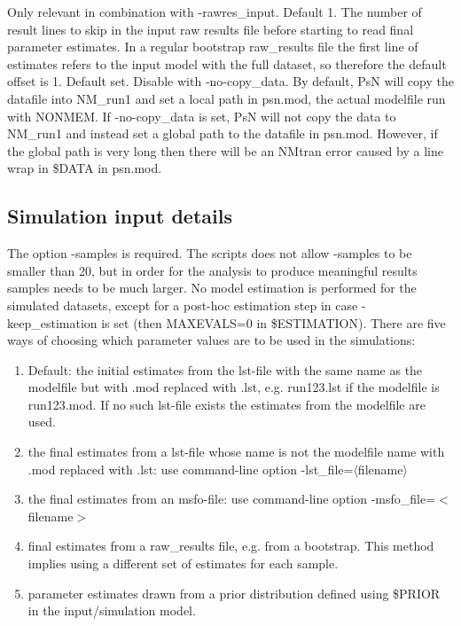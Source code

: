\begin{optionlist}
\nextopt
{}
Only relevant in combination with -rawres\_input. Default 1. The number of result lines to skip in the input raw results file before starting to read final parameter estimates. In a regular bootstrap raw\_results file the first line of estimates refers to the input model with the full dataset, so therefore the default offset is 1. 
\nextopt
{}
Default set. Disable with -no-copy\_data. By default, PsN will copy the datafile into NM\_run1 and set a local path in psn.mod, the actual modelfile run with NONMEM. If -no-copy\_data is set, PsN will not copy the data to NM\_run1 and instead set a global path to the datafile in psn.mod. However, if the global path is very long then there will be an NMtran error  caused by a line wrap in \$DATA in psn.mod.  
\end{optionlist}




\subsection{Simulation input details}
The option -samples is required. The scripts does not allow -samples to be smaller than 20, but in order for the analysis to produce meaningful results samples needs to be much larger. No model estimation is performed for the simulated datasets, except for a post-hoc estimation step in case -keep\_estimation is set (then MAXEVALS=0 in \$ESTIMATION). There are five ways of choosing which parameter values are to be used in the simulations: 

\begin{enumerate}
	\item Default: the initial estimates from the lst-file with the same name as the modelfile but with .mod replaced with .lst, e.g. run123.lst if the modelfile is run123.mod. If no such lst-file exists the estimates from the modelfile are used.
	\item the final estimates from a lst-file whose name is not the modelfile name with .mod replaced with .lst: use command-line option -lst\_file=$\langle$filename$\rangle$
	\item the final estimates from an msfo-file: use command-line option -msfo\_file=$<$filename$>$
	\item final estimates from a raw\_results file, e.g. from a bootstrap. This method implies using a different set of estimates for each sample. 
	\item parameter estimates drawn from a prior distribution defined using \$PRIOR in the input/simulation model.
\end{enumerate}

